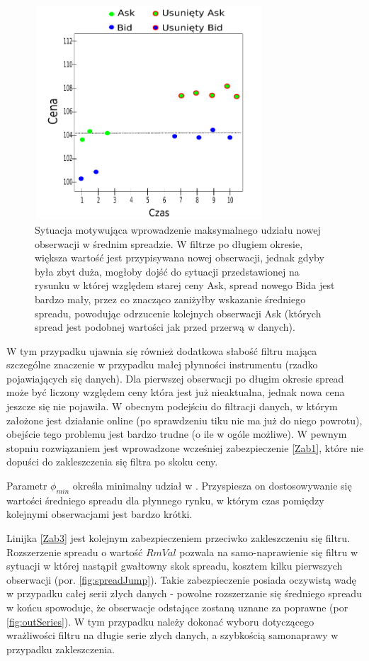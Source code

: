 \documentclass[a4paper,12pt,openany, DIV=calc, headsepline]{scrbook}
\begin{document}
\begin{figure}[h]
  \centering
  \includegraphics[width=85mm, height=80mm]{wykresy/longTime}
  \caption{Sytuacja motywująca wprowadzenie maksymalnego udziału nowej obserwacji w średnim spreadzie. W filtrze po długiem okresie, większa wartość jest przypisywana nowej obserwacji, jednak gdyby była zbyt duża, mogłoby dojść do sytuacji przedstawionej na rysunku w której względem starej ceny Ask, spread nowego Bida jest bardzo mały, przez co znacząco zaniżyłby wskazanie średniego spreadu, powodując odrzucenie kolejnych obserwacji Ask (których spread jest podobnej wartości jak przed przerwą w danych).}
  \label{fig:longTime}
\end{figure}

W tym przypadku ujawnia się również dodatkowa słabość filtru mająca szczególne znaczenie w przypadku małej płynności instrumentu (rzadko pojawiających się danych). Dla pierwszej obserwacji po długim okresie spread może być liczony względem ceny która jest już nieaktualna, jednak nowa cena jeszcze się nie pojawiła. W obecnym podejściu do filtracji danych, w którym założone jest działanie online (po sprawdzeniu tiku nie ma już do niego powrotu), obejście tego problemu jest bardzo trudne (o ile w ogóle możliwe). W pewnym stopniu rozwiązaniem jest wprowadzone wcześniej zabezpieczenie \ref{Zab1}, które nie dopuści do zakleszczenia się filtra po skoku ceny.

Parametr $\phi_{min}$ określa minimalny udział \Spt w \MSpn. Przyspiesza on dostosowywanie się wartości średniego spreadu dla płynnego rynku, w którym czas pomiędzy kolejnymi obserwacjami jest bardzo krótki.

Linijka \ref{Zab3} jest kolejnym zabezpieczeniem przeciwko zakleszczeniu się filtru. Rozszerzenie spreadu o wartość $RmVal$ pozwala na samo-naprawienie się filtru w sytuacji w której nastąpił gwałtowny skok spreadu, kosztem kilku pierwszych obserwacji (por. \ref{fig:spreadJump}). Takie zabezpieczenie posiada oczywistą wadę w przypadku całej serii złych danych - powolne rozszerzanie się średniego spreadu w końcu spowoduje, że obserwacje odstające zostaną uznane za poprawne (por \ref{fig:outSeries}). W tym przypadku należy dokonać wyboru dotyczącego wrażliwości filtru na długie serie złych danych, a szybkością samonaprawy w przypadku zakleszczenia. 
\end{document}
